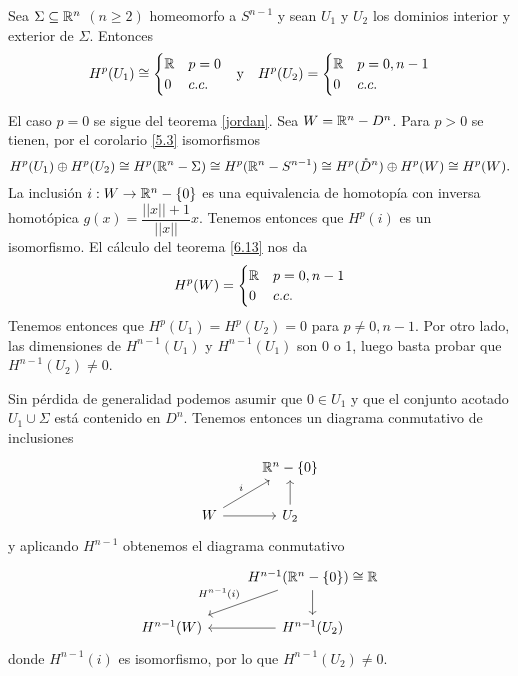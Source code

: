\documentclass[CV.tex]{subfiles}
\begin{document}
\begin{prop}\label{7.16}
Sea $\Sigma\subseteq\mathbb{R}^n$ $(n\geq 2)$ homeomorfo a $S^{n-1}$ y sean $U_1$ y $U_2$ los dominios interior y exterior de $\Sigma$. Entonces
\begin{align*}
&H^p(U_1)\cong \begin{cases}
\mathbb{R} & p=0\\
0 & c.c.
\end{cases} &\text{y}& & H^p(U_2)=\begin{cases}
\mathbb{R} & p=0,n-1\\
0 & c.c.
\end{cases}
\end{align*}
\end{prop}
\begin{dem}
El caso $p=0$ se sigue del teorema \ref{jordan}. Sea $W=\mathbb{R}^n-D^n$. Para $p>0$ se tienen, por el corolario \ref{5.3} isomorfismos
\[
H^p(U_1)\oplus H^p(U_2)\cong H^p(\mathbb{R}^n-\Sigma)\cong H^p(\mathbb{R}^n-S^{n-1})\cong H^p(\mathring{D}^n)\oplus H^p(W)\cong H^p(W).
\]
La inclusión $i:W\to\mathbb{R}^n-\{0\}$ es una equivalencia de homotopía con inversa homotópica $g(x)=\dfrac{||x||+1}{||x||}x$. Tenemos entonces que $H^p(i)$ es un isomorfismo. El cálculo del teorema \ref{6.13} nos da
\[
H^p(W)=\begin{cases}
\mathbb{R} & p=0,n-1\\
0 & c.c.
\end{cases}
\]
Tenemos entonces que $H^p(U_1)=H^p(U_2)=0$ para $p\neq 0, n-1$. Por otro lado, las dimensiones de $H^{n-1}(U_1)$ y $H^{n-1}(U_1)$ son 0 o 1, luego basta probar que $H^{n-1}(U_2)\neq 0$. 

Sin pérdida de generalidad podemos asumir que $0\in U_1$ y que el conjunto acotado $U_1\cup\Sigma$ está contenido en $D^n$. Tenemos entonces un diagrama conmutativo de inclusiones
\[
\begin{tikzcd}
& \R^n-\{0\}\\
W\arrow[ur, "i"]\arrow[r] & U_2\arrow[u]
\end{tikzcd}
\]
y aplicando $H^{n-1}$ obtenemos el diagrama conmutativo
\[
\begin{tikzcd}
& H^{n-1}(\R^n-\{0\})\cong\R\arrow[dl, "H^{n-1}(i)"']\arrow[d]\\
H^{n-1}(W)& H^{n-1}(U_2)\arrow[l] 
\end{tikzcd}
\]
donde $H^{n-1}(i)$ es isomorfismo, por lo que $H^{n-1}(U_2)\neq 0$.
\QED
\end{dem}
\end{document}
